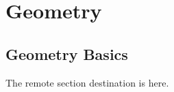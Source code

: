 \section{Geometry}\label{geometry}

\hypertarget{geometry}{}

\subsection{Geometry Basics}\label{geometry-basics}

\hypertarget{geometry-basics}{}

The remote section destination is here.
